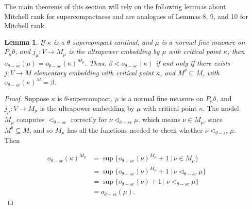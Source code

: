 \documentclass[10pt,leqno]{amsart}
\newtheorem{lemma}[theorem]{Lemma}
\begin{document}
The main theorems of this section will rely on the following lemmas about Mitchell rank for supercompactness and are analogues of Lemmas 8, 9, and 10 for Mitchell rank.

\begin{lemma} If $\kappa$ is a $\theta$-supercompact cardinal, and $\mu$ is a normal fine measure on $P_{\kappa}\theta$, and $j_{\mu} : V \to M_{\mu}$ is the ultrapower embedding by $\mu$ with critical point $\kappa$, then $o_{\theta-sc}(\mu) = o_{\theta-sc}(\kappa)^{M_{\mu}}$. Thus, $\beta < o_{\theta-sc}(\kappa)$ if and only if there exists $j : V \to M$ elementary embedding with critical point $\kappa$, and $M^{\theta} \subseteq M$, with $o_{\theta-sc}(\kappa)^M = \beta$.
\end{lemma}

\begin{proof} Suppose $\kappa$ is $\theta$-supercompact, $\mu$ is a normal fine measure on $P_{\kappa}\theta$, and $j_{\mu}:V \to M_{\mu}$ is the ultrapower embedding by $\mu$ with critical point $\kappa$. The model $M_{\mu}$ computes $\vartriangleleft_{\theta-sc}$ correctly for $\nu \vartriangleleft_{\theta-sc} \mu$, which means $\nu \in M_{\mu}$, since $M^{\theta} \subseteq M$, and so $M_{\mu}$ has all the functions needed to check whether $\nu \vartriangleleft_{\theta-sc} \mu$. Then

\begin{equation}
\begin{split}
o_{\theta-sc}(\kappa)^{M_{\mu}} & = \sup\{o_{\theta-sc}(\nu)^{M_{\mu}} + 1 \ | \ \nu \in M_{\mu} \} \\
 & = \sup\{o_{\theta-sc}(\nu)^{M_{\mu}}+1 \ | \ \nu \vartriangleleft_{\theta-sc} \mu\}\\
 & = \sup\{o_{\theta-sc}(\nu) + 1 \ | \ \nu \vartriangleleft_{\theta-sc} \mu\} \\
 & = o_{\theta-sc}(\mu).
\end{split}
\end{equation}


\end{proof}
\end{document}
